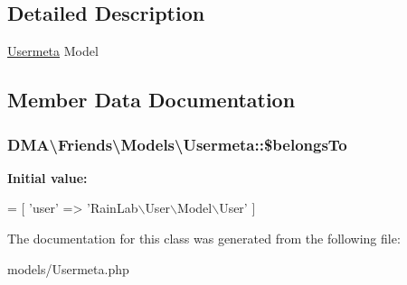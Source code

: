 \subsection{Detailed Description}
\hyperlink{classDMA_1_1Friends_1_1Models_1_1Usermeta}{Usermeta} Model 

\subsection{Member Data Documentation}
\hypertarget{classDMA_1_1Friends_1_1Models_1_1Usermeta_a93ae6777a48086374de412273d1d092e}{
\subsubsection[{\$belongs\-To}]{\setlength{\rightskip}{0pt plus 5cm}D\-M\-A\textbackslash{}\-Friends\textbackslash{}\-Models\textbackslash{}\-Usermeta\-::\$belongs\-To}}\label{classDMA_1_1Friends_1_1Models_1_1Usermeta_a93ae6777a48086374de412273d1d092e}
{\bfseries Initial value\-:}
\begin{DoxyCode}
= [
        \textcolor{stringliteral}{'user'}  => \textcolor{stringliteral}{'RainLab\(\backslash\)User\(\backslash\)Model\(\backslash\)User'}
    ]
\end{DoxyCode}


The documentation for this class was generated from the following file\-:\begin{DoxyCompactItemize}
\item 
models/Usermeta.\-php\end{DoxyCompactItemize}
